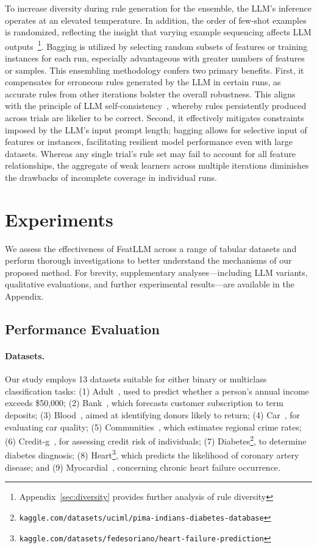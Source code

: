 To increase diversity during rule generation for the ensemble, the LLM's inference operates at an elevated temperature. In addition, the order of few-shot examples is randomized, reflecting the insight that varying example sequencing affects LLM outputs~\cite{lu2022fantastically}\footnote{Appendix~\ref{sec:diversity} provides further analysis of rule diversity}. Bagging is utilized by selecting random subsets of features or training instances for each run, especially advantageous with greater numbers of features or samples. This ensembling methodology confers two primary benefits. First, it compensates for erroneous rules generated by the LLM in certain runs, as accurate rules from other iterations bolster the overall robustness. This aligns with the principle of LLM self-consistency~\cite{wang2022self}, whereby rules persistently produced across trials are likelier to be correct. Second, it effectively mitigates constraints imposed by the LLM's input prompt length; bagging allows for selective input of features or instances, facilitating resilient model performance even with large datasets. Whereas any single trial's rule set may fail to account for all feature relationships, the aggregate of weak learners across multiple iterations diminishes the drawbacks of incomplete coverage in individual runs.

\section{Experiments}
We assess the effectiveness of \textsf{FeatLLM} across a range of tabular datasets and perform thorough investigations to better understand the mechanisms of our proposed method. For brevity, supplementary analyses—including LLM variants, qualitative evaluations, and further experimental results—are available in the Appendix. 

\subsection{Performance Evaluation}
\paragraph{Datasets.}
Our study employs 13 datasets suitable for either binary or multiclass classification tasks: (1) Adult~\cite{asuncion2007uci}, used to predict whether a person's annual income exceeds \$50,000; (2) Bank~\cite{moro2014data}, which forecasts customer subscription to term deposits; (3) Blood~\cite{yeh2009knowledge}, aimed at identifying donors likely to return; (4) Car~\cite{kadra2021well}, for evaluating car quality; (5) Communities~\cite{misc_communities_and_crime_183}, which estimates regional crime rates; (6) Credit-g~\cite{kadra2021well}, for assessing credit risk of individuals; (7) Diabetes\footnote{\texttt{kaggle.com/datasets/uciml/pima-indians-diabetes-database}}, to determine diabetes diagnosis; (8) Heart\footnote{\texttt{kaggle.com/datasets/fedesoriano/heart-failure-prediction}}, which predicts the likelihood of coronary artery disease; and (9) Myocardial~\cite{misc_myocardial_infarction_complications_579}, concerning chronic heart failure occurrence. 

